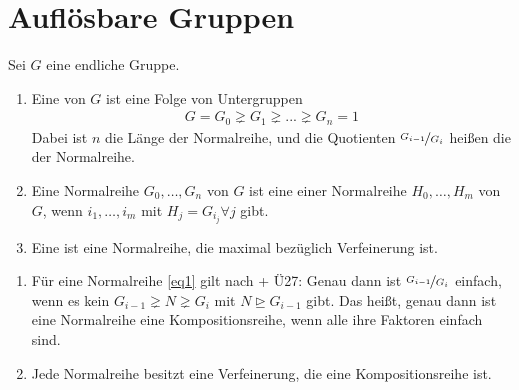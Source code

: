 \section{Auflösbare Gruppen}

Sei $G$ eine endliche Gruppe.

\begin{definition}
	\begin{enumerate}[label=(\alph*)]
		\item Eine  von $G$ ist eine Folge von Untergruppen
		\begin{align}
		\label{eq1}
		G = G_0 \gneq G_1 \gneq ... \gneq G_n = 1\tag{$\ast$} %
		\end{align}
		Dabei ist $n$ die Länge der Normalreihe, und die Quotienten $\nicefrac{G_{i-1}}{G_i}$ heißen die  der Normalreihe.
		\item Eine Normalreihe $G_0, \dots, G_n$ von $G$ ist eine  einer Normalreihe $H_0,\dots,H_m$  von $G$, wenn $i_1,\dots,i_m$ mit $H_j = G_{i_{j}} \forall j$ gibt.
		\item Eine  ist eine Normalreihe, die maximal bezüglich Verfeinerung ist.
	\end{enumerate}
\end{definition}

\begin{remark}
	\begin{enumerate}[label=(\alph*)]
		\item Für eine Normalreihe \eqref{eq1} gilt nach  + Ü27:
		Genau dann ist $\nicefrac{G_{i-1}}{G_i}$ einfach, wenn es kein $G_{i-1} \gneq N \gneq G_i$ mit $N \unrhd G_{i-1}$ gibt. Das heißt, genau dann ist eine Normalreihe eine Kompositionsreihe, wenn alle ihre Faktoren einfach sind. %
		\item Jede Normalreihe besitzt eine Verfeinerung, die eine Kompositionsreihe ist.
	\end{enumerate}
\end{remark}

